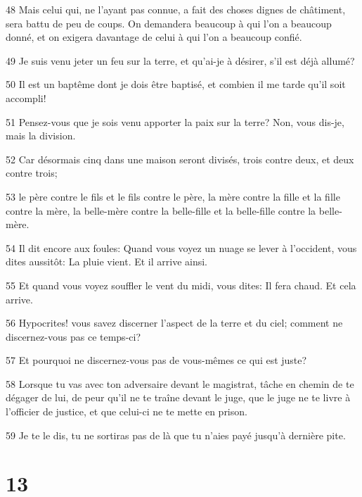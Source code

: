 \par 48 Mais celui qui, ne l'ayant pas connue, a fait des choses dignes de châtiment, sera battu de peu de coups. On demandera beaucoup à qui l'on a beaucoup donné, et on exigera davantage de celui à qui l'on a beaucoup confié.
\par 49 Je suis venu jeter un feu sur la terre, et qu'ai-je à désirer, s'il est déjà allumé?
\par 50 Il est un baptême dont je dois être baptisé, et combien il me tarde qu'il soit accompli!
\par 51 Pensez-vous que je sois venu apporter la paix sur la terre? Non, vous dis-je, mais la division.
\par 52 Car désormais cinq dans une maison seront divisés, trois contre deux, et deux contre trois;
\par 53 le père contre le fils et le fils contre le père, la mère contre la fille et la fille contre la mère, la belle-mère contre la belle-fille et la belle-fille contre la belle-mère.
\par 54 Il dit encore aux foules: Quand vous voyez un nuage se lever à l'occident, vous dites aussitôt: La pluie vient. Et il arrive ainsi.
\par 55 Et quand vous voyez souffler le vent du midi, vous dites: Il fera chaud. Et cela arrive.
\par 56 Hypocrites! vous savez discerner l'aspect de la terre et du ciel; comment ne discernez-vous pas ce temps-ci?
\par 57 Et pourquoi ne discernez-vous pas de vous-mêmes ce qui est juste?
\par 58 Lorsque tu vas avec ton adversaire devant le magistrat, tâche en chemin de te dégager de lui, de peur qu'il ne te traîne devant le juge, que le juge ne te livre à l'officier de justice, et que celui-ci ne te mette en prison.
\par 59 Je te le dis, tu ne sortiras pas de là que tu n'aies payé jusqu'à dernière pite.

\chapter{13}

